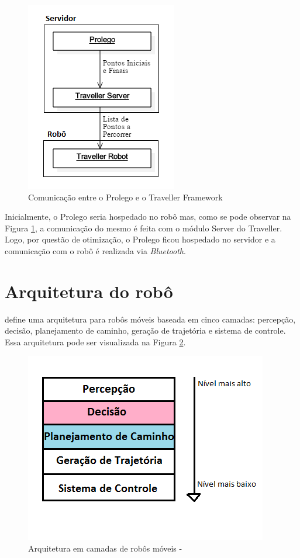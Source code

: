  \FloatBarrier
\begin{figure}[!h]
\centering
\includegraphics[keepaspectratio=true,scale=0.9]{figuras/Comunicacao_Prolego_Traveller.png}
\caption{Comunicação entre o Prolego e o Traveller Framework}
\label{ComunicacaoProlegoTraveller}
\end{figure}
 
 
 Inicialmente, o Prolego seria hospedado no robô mas, como se pode observar na Figura \ref{ComunicacaoProlegoTraveller}, a comunicação do mesmo é feita com o módulo Server do Traveller. Logo, por questão de otimização, o Prolego ficou hospedado no servidor e a comunicação com o robô é realizada via \textit{Bluetooth}.

\section{Arquitetura do robô}\label{arquiteturaDoRobo}
 define uma arquitetura para robôs móveis baseada em cinco camadas: percepção, decisão, planejamento de caminho, geração de trajetória e sistema de controle. Essa arquitetura pode ser visualizada na Figura \ref{arquiteturaCamadas}.

\FloatBarrier
\begin{figure}[!h]
\centering
\includegraphics[keepaspectratio=true,scale=0.9]{figuras/arquiteturaCamadas.png}
\caption{Arquitetura em camadas de robôs móveis - }
\label{arquiteturaCamadas}
\end{figure}

